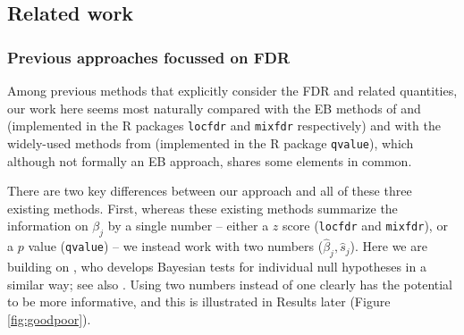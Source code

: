 \documentclass[11pt]{article}
\def\bhat{\hat{\beta}}
\def\shat{\hat{s}}
\def\qvalue{{\tt qvalue}\xspace}
\def\locfdr{{\tt locfdr}\xspace}
\def\mixfdr{{\tt mixfdr}\xspace}
\begin{document}


\subsection*{Related work}

\subsubsection*{Previous approaches focussed on FDR}

Among previous methods that explicitly consider the FDR and related quantities,
our work here seems most naturally compared with the EB methods of \cite{efron2008microarrays} and \cite{muralidharan2010empirical}
 (implemented in the R packages \locfdr and \mixfdr respectively) and with the widely-used methods from  \cite{storey.03} (implemented in the R package \qvalue), which although not formally an EB approach, shares some elements in common.

There are two key differences between our approach and all of these three existing methods. First, 
whereas these existing methods summarize the information on $\beta_j$ by a single number -- either a $z$ score (\locfdr and \mixfdr), or a $p$ value (\qvalue) -- 
we instead work with two numbers ($\bhat_j,\shat_j$). Here we are building on \cite{wakefield:2009}, who develops Bayesian tests 
for individual null hypotheses in a similar way; see also \cite{efron1993bayes}.
Using two numbers instead of one clearly has the potential to be more informative, and this is illustrated in Results later (Figure \ref{fig:goodpoor}).

\end{document}
